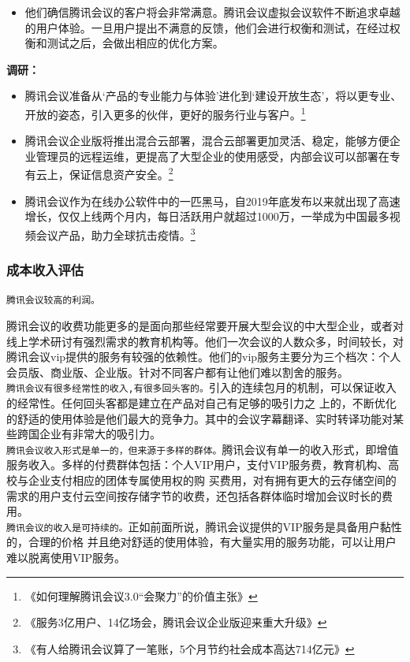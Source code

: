 \documentclass[a4paper,12pt]{article}
\begin{document}
\begin{itemize}
  \item 他们确信腾讯会议的客户将会非常满意。腾讯会议虚拟会议软件不断追求卓越的用户体验。一旦用户提出不满意的反馈，他们会进行权衡和测试，在经过权衡和测试之后，会做出相应的优化方案。
\end{itemize}
\textbf{调研：}
\begin{itemize}
    \item 腾讯会议准备从‘产品的专业能力与体验’进化到‘建设开放生态’，将以更专业、开放的姿态，引入更多的伙伴，更好的服务行业与客户。\footnote{《如何理解腾讯会议3.0“会聚力”的价值主张》}
    \item 腾讯会议企业版将推出混合云部署，混合云部署更加灵活、稳定，能够方便企业管理员的远程运维，更提高了大型企业的使用感受，内部会议可以部署在专有云上，保证信息资产安全。\footnote{《服务3亿用户、14亿场会，腾讯会议企业版迎来重大升级》}
    \item 腾讯会议作为在线办公软件中的一匹黑马，自2019年底发布以来就出现了高速增长，仅仅上线两个月内，每日活跃用户就超过1000万，一举成为中国最多视频会议产品，助力全球抗击疫情。\footnote{《有人给腾讯会议算了一笔账，5个月节约社会成本高达714亿元》}
\end{itemize}
\subsubsection{成本收入评估}
\texttt{腾讯会议较高的利润。}

腾讯会议的收费功能更多的是面向那些经常要开展大型会议的中大型企业，或者对
线上学术研讨有强烈需求的教育机构等。他们一次会议的人数众多，时间较长，对腾讯会议vip提供的服务有较强的依赖性。他们的vip服务主要分为三个档次：个人会员版、商业版、企业版。针对不同客户都有让他们难以割舍的服务。\\

\texttt{腾讯会议有很多经常性的收入,有很多回头客的。}引入的连续包月的机制，可以保证收入的经常性。任何回头客都是建立在产品对自己有足够的吸引力之
上的，不断优化的舒适的使用体验是他们最大的竞争力。其中的会议字幕翻译、实时转译功能对某些跨国企业有非常大的吸引力。\\

\texttt{腾讯会议收入形式是单一的，但来源于多样的群体。}腾讯会议有单一的收入形式，即增值服务收入。多样的付费群体包括：个人VIP用户，支付VIP服务费，教育机构、高校与企业支付相应的团体专属使用权的购
买费用，对有拥有更大的云存储空间的需求的用户支付云空间按存储字节的收费，还包括各群体临时增加会议时长的费用。\\

\texttt{腾讯会议的收入是可持续的。}正如前面所说，腾讯会议提供的VIP服务是具备用户黏性的，合理的价格
并且绝对舒适的使用体验，有大量实用的服务功能，可以让用户难以脱离使用VIP服务。\\
\end{document}
